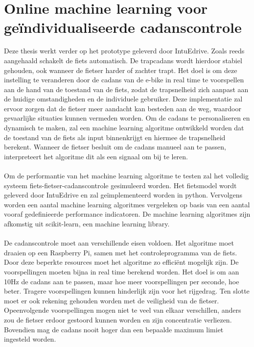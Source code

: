 \section{Online machine learning voor geïndividualiseerde cadanscontrole}
Deze thesis werkt verder op het prototype geleverd door IntuEdrive. Zoals reeds aangehaald schakelt de fiets automatisch. De trapcadans wordt hierdoor stabiel gehouden, ook wanneer de fietser harder of zachter trapt. Het doel is om deze instelling te veranderen door de cadans van de e-bike in real time te voorspellen aan de hand van de toestand van de fiets, zodat de trapsnelheid zich aanpast aan de huidige omstandigheden en de individuele gebruiker. Deze implementatie zal ervoor zorgen dat de fietser meer aandacht kan besteden aan de weg, waardoor gevaarlijke situaties kunnen vermeden worden. Om de cadans te personaliseren en dynamisch te maken, zal een machine learning algoritme ontwikkeld worden dat de toestand van de fiets als input binnenkrijgt en hiermee de trapsnelheid berekent. Wanneer de fietser besluit om de cadans manueel aan te passen, interpreteert het algoritme dit als een signaal om bij te leren.
\\\\
Om de performantie van het machine learning algoritme te testen zal het volledig systeem fiets-fietser-cadanscontrole gesimuleerd worden. Het fietsmodel wordt geleverd door IntuEdrive en zal geïmplementeerd worden in python. Vervolgens worden een aantal machine learning algoritmes vergeleken op basis van een aantal vooraf gedefinieerde performance indicatoren. De machine learning algoritmes zijn afkomstig uit scikit-learn, een machine learning library.
\\\\
De cadanscontrole moet aan verschillende eisen voldoen. Het algoritme moet draaien op een Raspberry Pi, samen met het controleprogramma van de fiets. Door deze beperkte resources moet het algoritme zo efficiënt mogelijk zijn. De voorspellingen moeten bijna in real time berekend worden. Het doel is om aan 10Hz de cadans aan te passen, maar hoe meer voorspellingen per seconde, hoe beter. Tragere voorspellingen kunnen hinderlijk zijn voor het rijgedrag. Ten slotte moet er ook rekening gehouden worden met de veiligheid van de fietser. Opeenvolgende voorspellingen mogen niet te veel van elkaar verschillen, anders zou de fietser erdoor gestoord kunnen worden en zijn concentratie verliezen. Bovendien mag de cadans nooit hoger dan een bepaalde maximum limiet ingesteld worden.
\\\\
